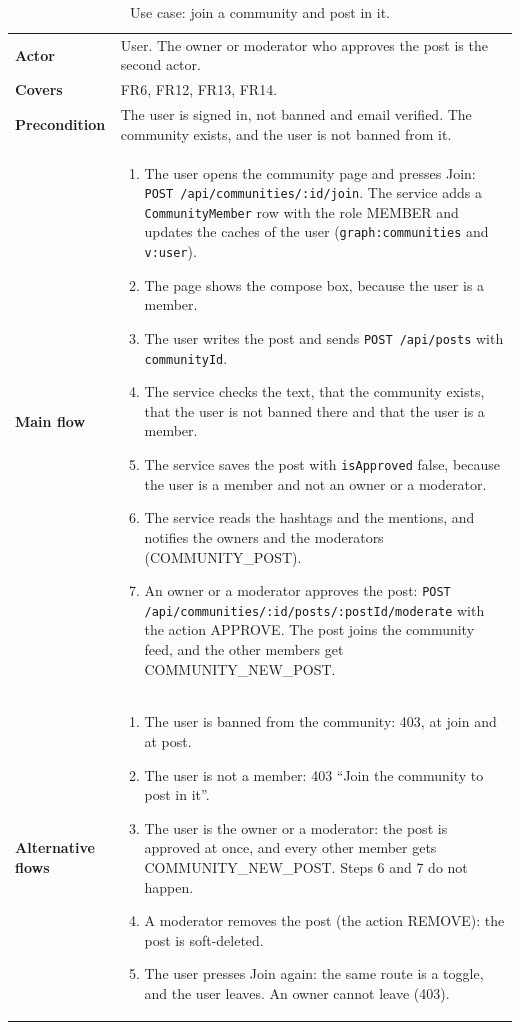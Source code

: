 {\small\singlespacing
\begin{longtable}{@{}>{\raggedright\arraybackslash}p{2.5cm} >{\raggedright\arraybackslash}p{\dimexpr\textwidth-2.5cm-2\tabcolsep\relax}@{}}
  \caption{Use case: join a community and post in it.}
  \label{tab:design-uc-community}\\
  \toprule
  \textbf{Actor} & User. The owner or moderator who approves the post is the second actor. \\
  \textbf{Covers} & FR6, FR12, FR13, FR14. \\
  \midrule
  \textbf{Precondition} & The user is signed in, not banned and email verified. The community exists, and the user is not banned from it. \\
  \midrule
  \textbf{Main flow} &
  \begin{enumerate}[nosep,leftmargin=*,label=\arabic*.]
    \item The user opens the community page and presses Join: \texttt{POST /api/communities/:id/join}. The service adds a \texttt{CommunityMember} row with the role MEMBER and updates the caches of the user (\texttt{graph:communities} and \texttt{v:user}).
    \item The page shows the compose box, because the user is a member.
    \item The user writes the post and sends \texttt{POST /api/posts} with \texttt{communityId}.
    \item The service checks the text, that the community exists, that the user is not banned there and that the user is a member.
    \item The service saves the post with \texttt{isApproved} false, because the user is a member and not an owner or a moderator.
    \item The service reads the hashtags and the mentions, and notifies the owners and the moderators (COMMUNITY\_POST).
    \item An owner or a moderator approves the post: \texttt{POST /api/communities/:id/posts/:postId/moderate} with the action APPROVE. The post joins the community feed, and the other members get COMMUNITY\_NEW\_POST.
  \end{enumerate} \\
  \midrule
  \textbf{Alternative flows} &
  \begin{enumerate}[nosep,leftmargin=*,label=A\arabic*.]
    \item The user is banned from the community: 403, at join and at post.
    \item The user is not a member: 403 ``Join the community to post in it''.
    \item The user is the owner or a moderator: the post is approved at once, and every other member gets COMMUNITY\_NEW\_POST. Steps 6 and 7 do not happen.
    \item A moderator removes the post (the action REMOVE): the post is soft-deleted.
    \item The user presses Join again: the same route is a toggle, and the user leaves. An owner cannot leave (403).
  \end{enumerate} \\
  \bottomrule
\end{longtable}}

